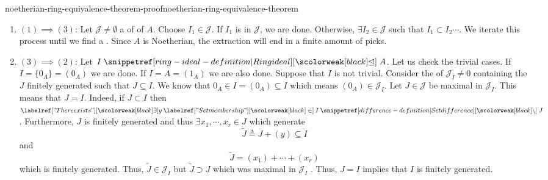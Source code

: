 \documentclass[preview]{standalone}
\begin{document}
\begin{snippetproof}{noetherian-ring-equivalence-theorem-proof}{noetherian-ring-equivalence-theorem}{}
    \begin{enumerate}
        \item \((1) \implies (3)\): Let \(\mathcal{J} \neq \emptyset\)
        a \set of \ideal[ideals] of \(A\).
        Choose \(I_1 \in \mathcal{J}\).
        If \(I_1\) is \maximalideal[maximal] in \(\mathcal{J}\), we are done.
        Otherwise, \(\exists I_2 \in \mathcal{J}\) such that \(I_1 \subset I_2 \cdots\).
        We iterate this process until we find a \maximalideal.
        Since \(A\) is Noetherian, the extraction will end in a finite amount of picks.
        \item \((3) \implies (2)\): Let \(I \idealin A\).
        Let us check the trivial cases.
        If \(I = \{0_A\} = (0_A)\) we are done.
        If \(I = A = (1_A)\) we are also done.
        Suppose that \(I\) is not trivial.
        Consider the \set of \ideal[ideals] \(\mathcal{J}_I \neq 0\) containing the \ideal[ideals] \(J\)
        finitely generated such that \(J \subseteq I\).
        We know that \(0_A \in I = (0_A) \subseteq I\)
        which means \((0_A) \in \mathcal{J}_I\).
        Let \(J \in \mathcal{J}\) be maximal in \(\mathcal{J}_I\).
        This means that \(J = I\).
        Indeed, if \(J \subset I\) then \(\exists y \in I \difference J\).
        Furthermore, \(J\) is finitely generated and thus \(\exists x_1, \cdots, x_r \in J\)
        which generate
        \[
            \tilde{J} \triangleq J + (y) \subseteq I
        \]
        and
        \[
            \tilde{J} = (x_1) + \cdots + (x_r)
        \]
        which is finitely generated.
        Thus, \(\tilde{J} \in \mathcal{J}_I\) but \(\tilde{J} \supset J\) which was maximal
        in \(\mathcal{J}_I\) \lightning.
        Thus, \(J = I\) implies that \(I\) is finitely generated.
    \end{enumerate}
\end{snippetproof}
\end{document}
